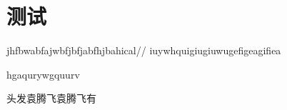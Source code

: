 \chapter{测试}
jhfbwabfajwbfjbfjabfhjbahical//
iuywhquigiugiuwugefigeagifiea

hgaqurywgquurv


头发袁腾飞袁腾飞有
